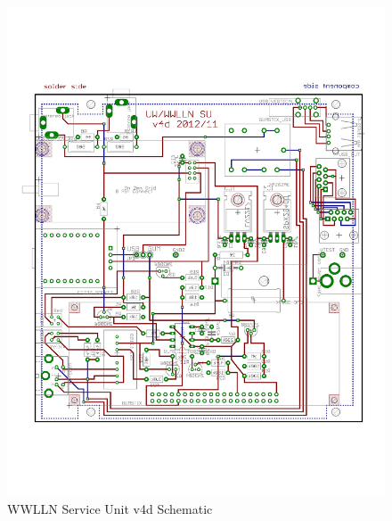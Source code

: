 \begin{figure}[ht!]
   \centering
   \includegraphics[scale=.75]{Appendix/Figures/wwlln_SU_v4.pdf} 
   \caption{WWLLN Service Unit v4d Schematic}
   \label{su:fig:suBoard}
\end{figure}

